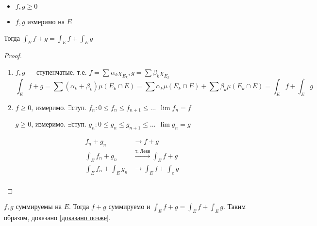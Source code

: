 \begin{theorem}\itemfix
    \begin{itemize}
        \item \(f, g \geq 0\)
        \item \(f, g\) измеримо на \(E\)
    \end{itemize}
    Тогда \(\int_E f + g = \int_E f + \int_E g\)
\end{theorem}
\begin{proof}\itemfix
    \begin{enumerate}
        \item \(f, g\) --- ступенчатые, т.е. \(f = \sum \alpha_k \chi_{E_k}, g = \sum \beta_k \chi_{E_k}\)
              \[\int_E f + g = \sum (\alpha_k + \beta_k)\mu(E_k\cap E) = \sum \alpha_k \mu (E_k \cap E) + \sum \beta_k \mu (E_k \cap E) = \int_E f + \int_E g\]

        \item \(f \geq 0\), измеримо. \(\exists \text{ступ. } f_n : 0 \leq f_n \leq f_{n+1} \leq \dots \ \ \lim f_n = f\)

              \(g \geq 0\), измеримо. \(\exists \text{ступ. } g_n : 0 \leq g_n \leq g_{n+1} \leq \dots \ \ \lim g_n = g\)

              \begin{align*}
                  f_n + g_n               & \to f + g                                 \\
                  \int_E f_n + g_n        & \xrightarrow{\text{т. Леви}} \int_E f + g \\
                  \int_E f_n + \int_E g_n & \to \int_E f + \int_e g                   \\
              \end{align*}
    \end{enumerate}
\end{proof}

\begin{corollary}
    \(f, g\) суммируемы на \(E\). Тогда \(f + g\) суммируемо и \(\int_{E} f + g = \int_E f + \int_E g\). Таким образом, доказано \ref{доказано позже}.
\end{corollary}

